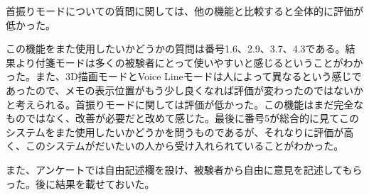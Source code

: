 \documentclass[11pt,a4j, titlepage]{jarticle} %
\begin{document}
首振りモードについての質問に関しては、他の機能と比較すると全体的に評価が低かった。

この機能をまた使用したいかどうかの質問は番号1.6、2.9、3.7、4.3である。結果より付箋モードは多くの被験者にとって使いやすいと感じるということがわかった。また、3D描画モードとVoice Lineモードは人によって異なるという感じであったので、メモの表示位置がもう少し良くなれば評価が変わったのではないかと考えられる。首振りモードに関しては評価が低かった。この機能はまだ完全なものではなく、改善が必要だと改めて感じた。最後に番号5が総合的に見てこのシステムをまた使用したいかどうかを問うものであるが、それなりに評価が高く、このシステムがだいたいの人から受け入れられていることがわかった。

また、アンケートでは自由記述欄を設け、被験者から自由に意見を記述してもらった。後に結果を載せておいた。
\end{document}
